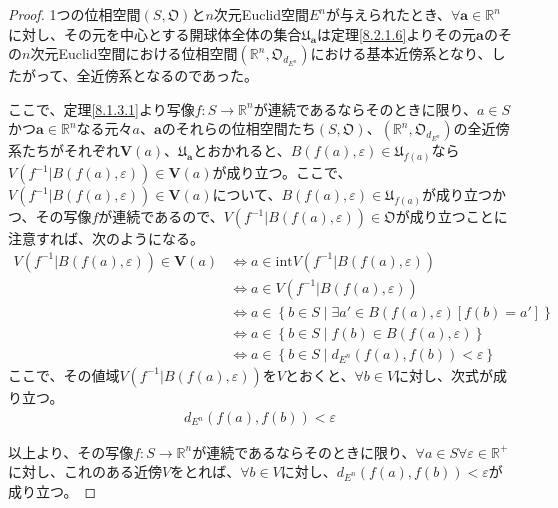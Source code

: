 \documentclass[dvipdfmx]{jsarticle}
\begin{document}
\begin{proof}
1つの位相空間$\left( S,\mathfrak{O} \right)$と$n$次元Euclid空間$E^{n}$が与えられたとき、$\forall\mathbf{a} \in \mathbb{R}^{n}$に対し、その元を中心とする開球体全体の集合$\mathfrak{U}_{\mathbf{a}}$は定理\ref{8.2.1.6}よりその元$\mathbf{a}$のその$n$次元Euclid空間における位相空間$\left( \mathbb{R}^{n},\mathfrak{O}_{d_{E^{n}}} \right)$における基本近傍系となり、したがって、全近傍系となるのであった。\par
ここで、定理\ref{8.1.3.1}より写像$f:S \rightarrow \mathbb{R}^{n}$が連続であるならそのときに限り、$a \in S$かつ$\mathbf{a} \in \mathbb{R}^{n}$なる元々$a$、$\mathbf{a}$のそれらの位相空間たち$\left( S,\mathfrak{O} \right)$、$\left( \mathbb{R}^{n},\mathfrak{O}_{d_{E^{n}}} \right)$の全近傍系たちがそれぞれ$\mathbf{V}(a)$、$\mathfrak{U}_{\mathbf{a}}$とおかれると、$B\left( f(a),\varepsilon \right) \in \mathfrak{U}_{f(a)}$なら$V\left( f^{- 1}|B\left( f(a),\varepsilon \right) \right) \in \mathbf{V}(a)$が成り立つ。ここで、$V\left( f^{- 1}|B\left( f(a),\varepsilon \right) \right) \in \mathbf{V}(a)$について、$B\left( f(a),\varepsilon \right) \in \mathfrak{U}_{f(a)}$が成り立つかつ、その写像$f$が連続であるので、$V\left( f^{- 1}|B\left( f(a),\varepsilon \right) \right)\in \mathfrak{O}$が成り立つことに注意すれば、次のようになる。
\begin{align*}
V\left( f^{- 1}|B\left( f(a),\varepsilon \right) \right) \in \mathbf{V}(a) &\Leftrightarrow a \in {\mathrm{int}}{V\left( f^{- 1}|B\left( f(a),\varepsilon \right) \right)}\\
&\Leftrightarrow a \in V\left( f^{- 1}|B\left( f(a),\varepsilon \right) \right)\\
&\Leftrightarrow a \in \left\{ b \in S \middle| \exists a' \in B\left( f(a),\varepsilon \right)\left[ f(b) = a' \right] \right\}\\
&\Leftrightarrow a \in \left\{ b \in S \middle| f(b) \in B\left( f(a),\varepsilon \right) \right\}\\
&\Leftrightarrow a \in \left\{ b \in S \middle| d_{E^{n}}\left( f(a),f(b) \right) < \varepsilon \right\}
\end{align*}
ここで、その値域$V\left( f^{- 1}|B\left( f(a),\varepsilon \right) \right)$を$V$とおくと、$\forall b \in V$に対し、次式が成り立つ。
\begin{align*}
d_{E^{n}}\left( f(a),f(b) \right) < \varepsilon
\end{align*}\par
以上より、その写像$f:S \rightarrow \mathbb{R}^{n}$が連続であるならそのときに限り、$\forall a \in S\forall\varepsilon \in \mathbb{R}^{+}$に対し、これのある近傍$V$をとれば、$\forall b \in V$に対し、$d_{E^{n}}\left( f(a),f(b) \right) < \varepsilon$が成り立つ。
\end{proof}
\end{document}
